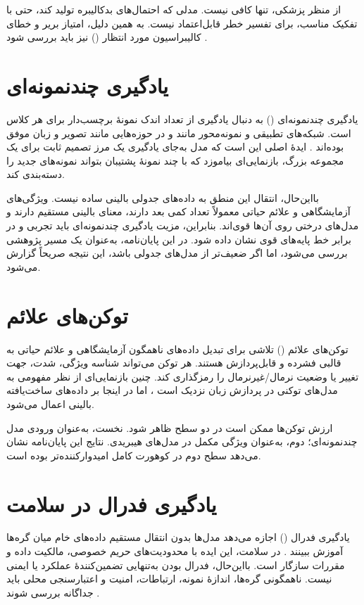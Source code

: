 از منظر پزشکی، تنها  کافی نیست. مدلی که احتمال‌های بدکالیبره تولید کند، حتی با تفکیک مناسب، برای تفسیر خطر قابل‌اعتماد نیست. به همین دلیل، امتیاز بریر و خطای کالیبراسیون مورد انتظار () نیز باید بررسی شود \cite{steyerberg2019clinical,vanCalster2019calibration}.

\section{یادگیری چندنمونه‌ای}
یادگیری چندنمونه‌ای () به دنبال یادگیری از تعداد اندک نمونۀ برچسب‌دار برای هر کلاس است. شبکه‌های تطبیقی و نمونه‌محور مانند  و  در حوزه‌هایی مانند تصویر و زبان موفق بوده‌اند \cite{vinyals2016matching,snell2017prototypical}. ایدۀ اصلی این است که مدل به‌جای یادگیری یک مرز تصمیم ثابت برای یک مجموعه بزرگ، بازنمایی‌ای بیاموزد که با چند نمونۀ پشتیبان بتواند نمونه‌های جدید را دسته‌بندی کند.

بااین‌حال، انتقال این منطق به داده‌های جدولی بالینی ساده نیست. ویژگی‌های آزمایشگاهی و علائم حیاتی معمولاً تعداد کمی بعد دارند، معنای بالینی مستقیم دارند و مدل‌های درختی روی آن‌ها قوی‌اند. بنابراین، مزیت یادگیری چندنمونه‌ای باید تجربی و در برابر خط پایه‌های قوی نشان داده شود. در این پایان‌نامه،  به‌عنوان یک مسیر پژوهشی بررسی می‌شود، اما اگر ضعیف‌تر از مدل‌های جدولی باشد، این نتیجه صریحاً گزارش می‌شود.

\section{توکن‌های علائم}
توکن‌های علائم () تلاشی برای تبدیل داده‌های ناهمگون آزمایشگاهی و علائم حیاتی به قالبی فشرده و قابل‌پردازش هستند. هر توکن می‌تواند شناسه ویژگی، شدت، جهت تغییر یا وضعیت نرمال/غیرنرمال را رمزگذاری کند. چنین بازنمایی‌ای از نظر مفهومی به مدل‌های توکنی در پردازش زبان نزدیک است \cite{vaswani2017attention}، اما در اینجا بر داده‌های ساخت‌یافته بالینی اعمال می‌شود.

ارزش توکن‌ها ممکن است در دو سطح ظاهر شود. نخست، به‌عنوان ورودی مدل چندنمونه‌ای؛ دوم، به‌عنوان ویژگی مکمل در مدل‌های هیبریدی. نتایج این پایان‌نامه نشان می‌دهد سطح دوم در کوهورت کامل امیدوارکننده‌تر بوده است.

\section{یادگیری فدرال در سلامت}
یادگیری فدرال () اجازه می‌دهد مدل‌ها بدون انتقال مستقیم داده‌های خام میان گره‌ها آموزش ببینند \cite{mcmahan2017communication,yang2019federated}. در سلامت، این ایده با محدودیت‌های حریم خصوصی، مالکیت داده و مقررات سازگار است. بااین‌حال، فدرال بودن به‌تنهایی تضمین‌کنندۀ عملکرد یا ایمنی نیست. ناهمگونی گره‌ها، اندازۀ نمونه، ارتباطات، امنیت و اعتبارسنجی محلی باید جداگانه بررسی شوند \cite{li2019federated,bonawitz2019towards}.

